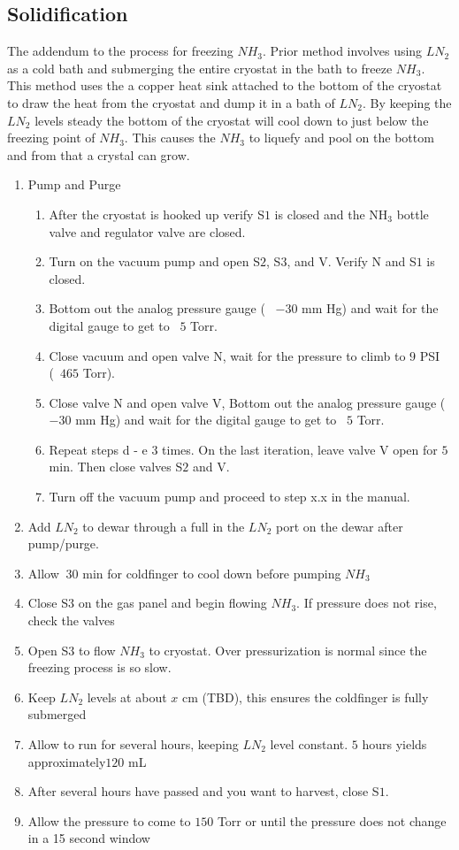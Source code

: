 \documentclass[12pt,notitlepage]{amsart}
\begin{document}
  \subsection{Solidification}
      The addendum to the process for freezing $NH_{3}$. Prior method involves using $LN_{2}$ as a cold bath and submerging the entire cryostat in the bath to freeze $NH_{3}$. This method uses the a copper heat sink attached to the bottom of the cryostat to draw the heat from the cryostat and dump it in a bath of $LN_{2}$. By keeping the $LN_{2}$ levels steady the bottom of the cryostat will cool down to just below the freezing point of $NH_{3}$. This causes the $NH_{3}$ to liquefy and pool on the bottom and from that a crystal can grow. 
      \begin{enumerate}
      		\item Pump and Purge
      		\begin{enumerate}
      			\item After the cryostat is hooked up verify S$1$ is closed and the NH$_{3}$ bottle valve and regulator valve are closed. 
      			\item Turn on the vacuum pump and open S$2$, S$3$, and V. Verify N and S$1$ is closed.
      			\item Bottom out the analog pressure gauge (~ $-30$ mm Hg) and wait for the digital gauge to get to ~$5$ Torr. 
      			\item Close vacuum and open valve N, wait for the pressure to climb to $9$ PSI (~$465$ Torr).
      			\item Close valve N and open valve V, Bottom out the analog pressure gauge (~ $-30$ mm Hg) and wait for the digital gauge to get to ~$5$ Torr. 
      			\item Repeat steps d - e $3$ times. On the last iteration, leave valve V open for $5$ min. Then close valves S$2$ and V. 
      			\item Turn off the vacuum pump and proceed to step x.x in the manual. 
      		\end{enumerate}
          \item Add $LN_{2}$ to dewar through a full in the $LN_{2}$ port on the dewar after pump/purge.
          \item Allow $~30$ min for coldfinger to cool down before pumping $NH_{3}$
          \item Close S$3$ on the gas panel and begin flowing $NH_{3}$. If pressure does not rise, check the valves
          \item Open S$3$ to flow $NH_{3}$ to cryostat. Over pressurization is normal since the freezing process is so slow.
          \item Keep $LN_{2}$ levels at about $x$ cm (TBD), this ensures the coldfinger is fully submerged
          \item Allow to run for several hours, keeping $LN_{2}$ level constant. $5$ hours yields approximately$120$ mL
          \item After several hours have passed and you want to harvest, close S$1$.
          \item Allow the pressure to come to $150$ Torr or until the pressure does not change in a 15 second window
      \end{enumerate}
\end{document}
